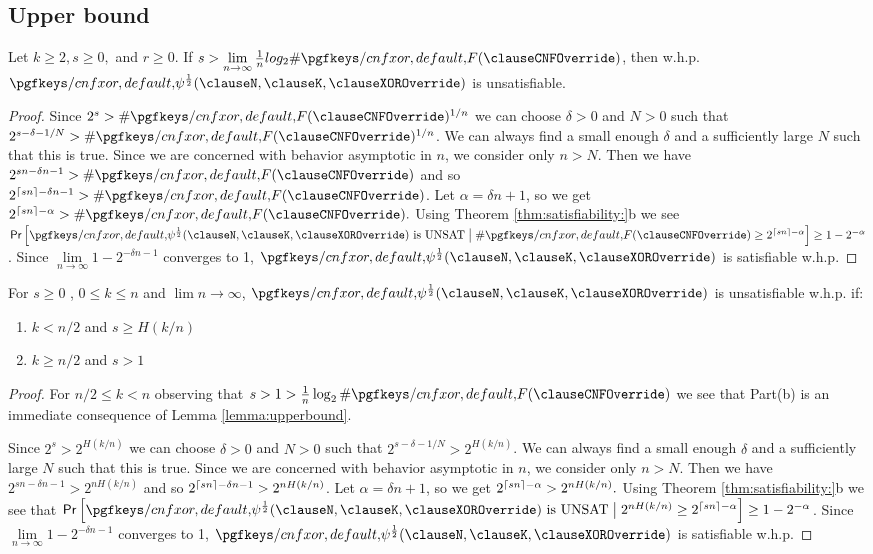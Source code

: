 \subsection{Upper bound}
\begin{lemma}
	\label{lemma:upperbound}	
	Let $k \geq 2, s\geq 0,$ and $r\geq 0$. If $s > \lim\limits_{n \to \infty} \frac{1}{n}{log_{2}\#\F}$, then w.h.p. $ \FQ$ is unsatisfiable.
\end{lemma}
\begin{proof}	Since $2^{s}  > \#\F^{1/n}$ we can choose $\delta > 0$ 	and $ N > 0$ such that $ 2^{s - \delta - 1/N} > \#\F^{1/n}$. We can always find a small enough $\delta$ and a sufficiently large $N$ such that this is true. Since we are concerned with behavior asymptotic in $n$, we consider only $n>N$. Then we have $2^{sn - \delta n -1} > \#\F$ and so $2^{\ceil{sn} - \delta n - 1} > \#\F$. Let $\alpha = \delta n + 1$, so we get $2^{\ceil{sn}-\alpha} > \#\F.$  Using Theorem \ref{thm:satisfiability:}b we see $\P{\FQ\text{ is UNSAT} \bigm\vert \#\F\geq2^{\ceil{sn} - \alpha} } \geq 1- 2^{-\alpha}$. Since $\lim \limits_{n \to \infty} 1-2^{-\delta n - 1}$ converges to 1, $\FQ$ is satisfiable w.h.p.
\end{proof}
\begin{lemma}
	\label{lemma:upperbound:approx}
	For $s \geq 0 $ , $ 0 \leq k\leq n$ and $\lim\limits{n \to \infty}$, $\FQ$ is unsatisfiable w.h.p. if:
	\begin{enumerate}
	\item $k<n/2 $ and $ s \geq  H(k/n) $
	\item $k\geq n/2$ and $ s > 1 $
	\end{enumerate}
\end{lemma}
\begin{proof}
 For $n/2 \leq k < n$ observing that $s>1>\frac{1}{n} \log_{2}\#\F$ we see that Part(b) is an immediate consequence of Lemma \ref{lemma:upperbound}.

	 Since $2^{s}  > 2^{H(k/n)}$ we can choose $\delta > 0$ 	and $ N > 0$ such that $ 2^{s - \delta - 1/N} > 2^{H(k/n)}$. We can always find a small enough $\delta$ and a sufficiently large $N$ such that this is true. Since we are concerned with behavior asymptotic in $n$, we consider only $n>N$. Then we have $2^{sn - \delta n -1} > 2^{nH(k/n)}$ and so $2^{\left\lceil sn\right\rceil - \delta n - 1} > 2^{nH(k/n)}$. Let $\alpha = \delta n + 1$, so we get $2^{\left\lceil sn\right\rceil-\alpha} > 2^{nH(k/n)}.$  Using Theorem \ref{thm:satisfiability:}b we see that $\P{\FQ\text{ is UNSAT} \bigm\vert 2^{nH(k/n)}\geq2^{\ceil{sn} - \alpha} } \geq 1- 2^{-\alpha}$. Since $\lim \limits_{n \to \infty} 1-2^{-\delta n - 1}$ converges to 1, $\FQ$ is satisfiable w.h.p.
\end{proof}